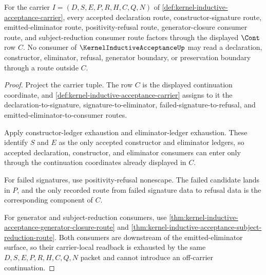 \begin{theorem}
\label{thm:kernel-inductive-acceptance-cont-route-totality}
For the carrier $I=(D,S,E,P,R,H,C,Q,N)$ of \autoref{def:kernel-inductive-acceptance-carrier}, every accepted declaration route, constructor-signature route, emitted-eliminator route, positivity-refusal route, generator-closure consumer route, and subject-reduction consumer route factors through the displayed $\Cont$ row $C$. No consumer of $\KernelInductiveAcceptanceUp$ may read a declaration, constructor, eliminator, refusal, generator boundary, or preservation boundary through a route outside $C$.
\end{theorem}
\begin{proof}
Project the carrier tuple. The row $C$ is the displayed continuation coordinate, and \autoref{def:kernel-inductive-acceptance-carrier} assigns to it the declaration-to-signature, signature-to-eliminator, failed-signature-to-refusal, and emitted-eliminator-to-consumer routes.

Apply constructor-ledger exhaustion and eliminator-ledger exhaustion. These identify $S$ and $E$ as the only accepted constructor and eliminator ledgers, so accepted declaration, constructor, and eliminator consumers can enter only through the continuation coordinates already displayed in $C$.

For failed signatures, use positivity-refusal nonescape. The failed candidate lands in $P$, and the only recorded route from failed signature data to refusal data is the corresponding component of $C$.

For generator and subject-reduction consumers, use \autoref{thm:kernel-inductive-acceptance-generator-closure-route} and \autoref{thm:kernel-inductive-acceptance-subject-reduction-route}. Both consumers are downstream of the emitted-eliminator surface, so their carrier-local readback is exhausted by the same $D,S,E,P,R,H,C,Q,N$ packet and cannot introduce an off-carrier continuation.
\end{proof}

